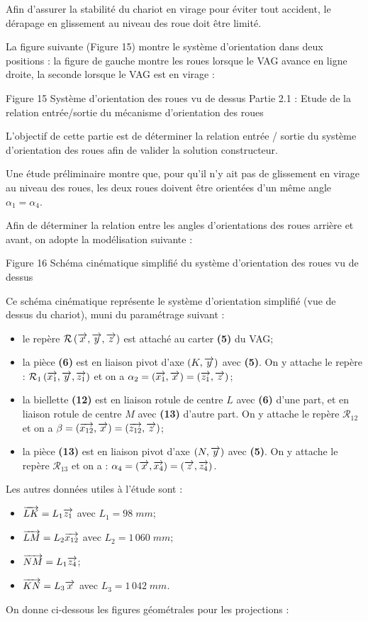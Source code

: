 \documentclass[10pt]{article}
\begin{document}
Afin d’assurer la stabilité du chariot en virage pour éviter tout accident, le dérapage en glissement au niveau des roue doit être limité.

La figure suivante (Figure 15) montre le système d’orientation dans deux positions : la figure de gauche montre les roues lorsque le VAG avance en ligne droite, la seconde lorsque le VAG est en virage :
 
Figure 15  Système d’orientation des roues vu de dessus
Partie 2.1 : Etude de la relation entrée/sortie du mécanisme d’orientation des roues

\begin{obj}
L’objectif de cette partie est de déterminer la relation entrée / sortie du système d’orientation des roues afin de valider la solution constructeur.

Une étude préliminaire montre que, pour qu’il n’y ait pas de glissement en virage au niveau des roues, les deux roues doivent être orientées d’un même angle $\alpha_1 = \alpha_4$.
\end{obj}

Afin de déterminer la relation entre les angles d’orientations des roues arrière et avant, on adopte la modélisation suivante :
 
Figure 16 Schéma cinématique simplifié du système d’orientation des roues vu de dessus

Ce schéma cinématique représente le système d’orientation simplifié (vue de dessus du chariot), muni du paramétrage suivant :
\begin{itemize}
\item le repère $\mathcal{R}\left(\overrightarrow{x},\overrightarrow{y},\overrightarrow{z} \right)$ est attaché au carter \textbf{(5)} du VAG;
\item la pièce \textbf{(6)} est en liaison pivot d’axe $\left(K,\overrightarrow{y} \right)$ avec \textbf{(5)}. On y attache le repère : $\mathcal{R}_1\left(\overrightarrow{x_1},\overrightarrow{y},\overrightarrow{z_1} \right)$    et on a $\alpha_2 =\left(\overrightarrow{x_1},\overrightarrow{x} \right)=\left( \overrightarrow{z_1},\overrightarrow{z} \right)$;
\item la biellette \textbf{(12)} est en liaison rotule de centre $L$ avec \textbf{(6)} d’une part, et en liaison rotule de centre $M$ avec \textbf{(13)} d’autre part. On y attache le repère $\mathcal{R}_{12}$ et on a $\beta=\left(\overrightarrow{x_{12}},\overrightarrow{x} \right)=\left( \overrightarrow{z_{12}},\overrightarrow{z} \right)$;
\item la pièce \textbf{(13)} est en liaison pivot d’axe $\left(N,\overrightarrow{y}\right)$ avec \textbf{(5)}. On y attache le repère $\mathcal{R}_{13}$ et on a : $\alpha_4=\left(\overrightarrow{x},\overrightarrow{x_4} \right)=\left( \overrightarrow{z},\overrightarrow{z_4} \right)$.
\end{itemize}
Les autres données utiles à l’étude sont :
\begin{itemize}
\item $\overrightarrow{LK}=L_1 \overrightarrow{z_1} $ avec $L_1 = 98\;mm$;
\item $\overrightarrow{LM}=L_2 \overrightarrow{x_{12}}$ avec $L_2 = 1\,060\;mm$;
\item $\overrightarrow{NM}=L_1 \overrightarrow{z_4}$;
\item $\overrightarrow{KN}=L_3 \overrightarrow{x}$ avec $L_3=1\,042\; mm$.
\end{itemize}
On donne ci-dessous les figures géométrales pour les projections :
 
\end{document}
